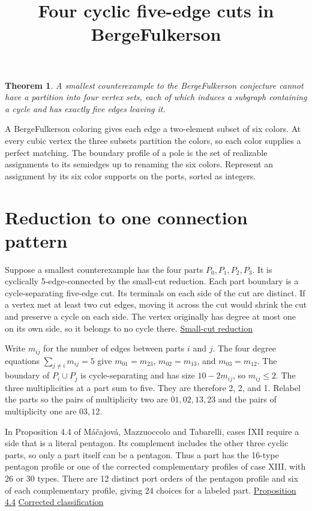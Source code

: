 \documentclass[10pt]{article}
\title{Four cyclic five-edge cuts in Berge\textendash{}Fulkerson}
\author{}
\date{}
\newtheorem*{theorem}{Theorem}
\begin{document}
\maketitle
\vspace{-2.5em}
\begin{theorem} A smallest counterexample to the Berge\textendash{}Fulkerson conjecture cannot have a partition into four vertex sets, each of which induces a subgraph containing a cycle and has exactly five edges leaving it.
\end{theorem}

A Berge\textendash{}Fulkerson coloring gives each edge a two-element subset of six colors. At every cubic vertex the three subsets partition the colors, so each color supplies a perfect matching. The boundary profile of a pole is the set of realizable assignments to its semiedges up to renaming the six colors. Represent an assignment by its six color supports on the ports, sorted as integers.

\section{Reduction to one connection pattern}

Suppose a smallest counterexample has the four parts $P_0,P_1,P_2,P_3$. It is cyclically 5-edge-connected by the small-cut reduction. Each part boundary is a cycle-separating five-edge cut. Its terminals on each side of the cut are distinct. If a vertex met at least two cut edges, moving it across the cut would shrink the cut and preserve a cycle on each side. The vertex originally has degree at most one on its own side, so it belongs to no cycle there. \href{https://iris.univr.it/handle/11562/1030915}{Small-cut reduction}

Write $m_{ij}$ for the number of edges between parts $i$ and $j$. The four degree equations $\sum_{j\ne i}m_{ij}=5$ give $m_{01}=m_{23}$, $m_{02}=m_{13}$, and $m_{03}=m_{12}$. The boundary of $P_i\cup P_j$ is cycle-separating and has size $10-2m_{ij}$, so $m_{ij}\leq2$. The three multiplicities at a part sum to five. They are therefore 2, 2, and 1. Relabel the parts so the pairs of multiplicity two are $01,02,13,23$ and the pairs of multiplicity one are $03,12$.

In Proposition 4.4 of M\'{a}\v{c}ajov\'{a}, Mazzuoccolo and Tabarelli, cases I\textendash{}XII require a side that is a literal pentagon. Its complement includes the other three cyclic parts, so only a part itself can be a pentagon. Thus a part has the 16-type pentagon profile or one of the corrected complementary profiles of case XIII, with 26 or 30 types. There are 12 distinct port orders of the pentagon profile and six of each complementary profile, giving 24 choices for a labeled part. \href{https://doi.org/10.26493/1855-3974.3409.c13}{Proposition 4.4} \enspace \href{https://github.com/claude-make-no-mistakes/berge-fulkerson-counterexample-search/blob/main/FIVE-CUT-TARGETS.md}{Corrected classification}
\end{document}
